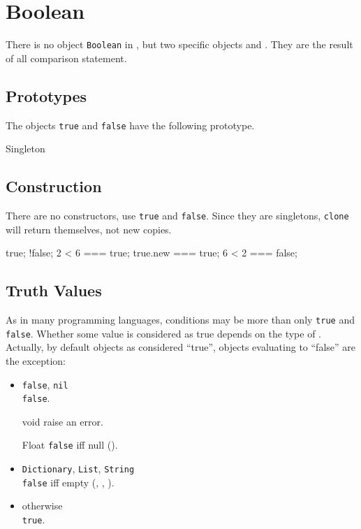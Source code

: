
\section{Boolean}

There is no object \lstinline|Boolean| in \us, but two specific
objects  and .  They are the result of
all comparison statement.


\subsection{Prototypes}

The objects \lstinline|true| and \lstinline|false| have the following
prototype.

\begin{refObjects}
\item[Singleton]
\end{refObjects}

\subsection{Construction}

There are no constructors, use \lstinline|true| and \lstinline|false|.
Since they are singletons, \lstinline|clone| will return themselves,
not new copies.

\begin{urbiassert}[firstnumber=1]
true;
!false;
2 < 6 === true;
true.new === true;
6 < 2 === false;
\end{urbiassert}

\subsection{Truth Values}
\label{sec:truth}

As in many programming languages, conditions may be more than only
\lstinline|true| and \lstinline|false|.  Whether some value is
considered as true depends on the type of \this.  Actually,
by default objects as considered ``true'', objects evaluating to
``false'' are the exception:
\begin{itemize}
\item \lstinline|false|, \lstinline|nil|\\
  \lstinline|false|.
\item[void]
  raise an error.
\item[Float]
  \lstinline|false| iff null ().
\item \lstinline|Dictionary|, \lstinline|List|,  \lstinline|String|\\
  \lstinline|false| iff empty (,
  , ).
\item otherwise\\
  \lstinline|true|.
\end{itemize}

